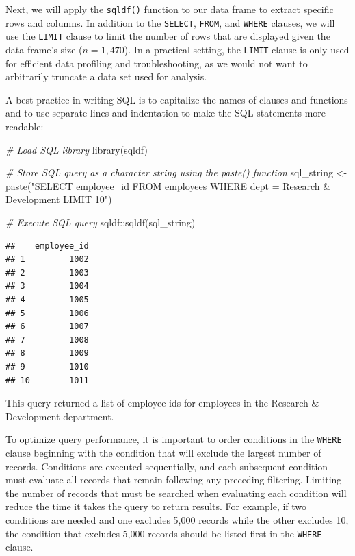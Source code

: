 \documentclass[
]{book}
\newenvironment{Shaded}{\begin{snugshade}}{\end{snugshade}}
\newcommand{\CommentTok}[1]{\textcolor[rgb]{0.56,0.35,0.01}{\textit{#1}}}
\newcommand{\FunctionTok}[1]{\textcolor[rgb]{0.00,0.00,0.00}{#1}}
\newcommand{\NormalTok}[1]{#1}
\newcommand{\OtherTok}[1]{\textcolor[rgb]{0.56,0.35,0.01}{#1}}
\newcommand{\SpecialCharTok}[1]{\textcolor[rgb]{0.00,0.00,0.00}{#1}}
\newcommand{\StringTok}[1]{\textcolor[rgb]{0.31,0.60,0.02}{#1}}
\begin{document}
Next, we will apply the \texttt{sqldf()} function to our data frame to extract specific rows and columns. In addition to the \texttt{SELECT}, \texttt{FROM}, and \texttt{WHERE} clauses, we will use the \texttt{LIMIT} clause to limit the number of rows that are displayed given the data frame's size (\(n = 1,470\)). In a practical setting, the \texttt{LIMIT} clause is only used for efficient data profiling and troubleshooting, as we would not want to arbitrarily truncate a data set used for analysis.

A best practice in writing SQL is to capitalize the names of clauses and functions and to use separate lines and indentation to make the SQL statements more readable:

\begin{Shaded}
\begin{Highlighting}[]
\CommentTok{\# Load SQL library}
\FunctionTok{library}\NormalTok{(sqldf)}

\CommentTok{\# Store SQL query as a character string using the paste() function}
\NormalTok{sql\_string }\OtherTok{\textless{}{-}} \FunctionTok{paste}\NormalTok{(}\StringTok{"SELECT}
\StringTok{                      employee\_id}
\StringTok{                    FROM}
\StringTok{                      employees}
\StringTok{                    WHERE}
\StringTok{                      dept = \textquotesingle{}Research \& Development\textquotesingle{}}
\StringTok{                    LIMIT 10"}\NormalTok{)}

\CommentTok{\# Execute SQL query}
\NormalTok{sqldf}\SpecialCharTok{::}\FunctionTok{sqldf}\NormalTok{(sql\_string)}
\end{Highlighting}
\end{Shaded}

\begin{verbatim}
##    employee_id
## 1         1002
## 2         1003
## 3         1004
## 4         1005
## 5         1006
## 6         1007
## 7         1008
## 8         1009
## 9         1010
## 10        1011
\end{verbatim}

This query returned a list of employee ids for employees in the Research \& Development department.

To optimize query performance, it is important to order conditions in the \texttt{WHERE} clause beginning with the condition that will exclude the largest number of records. Conditions are executed sequentially, and each subsequent condition must evaluate all records that remain following any preceding filtering. Limiting the number of records that must be searched when evaluating each condition will reduce the time it takes the query to return results. For example, if two conditions are needed and one excludes 5,000 records while the other excludes 10, the condition that excludes 5,000 records should be listed first in the \texttt{WHERE} clause.
\end{document}
